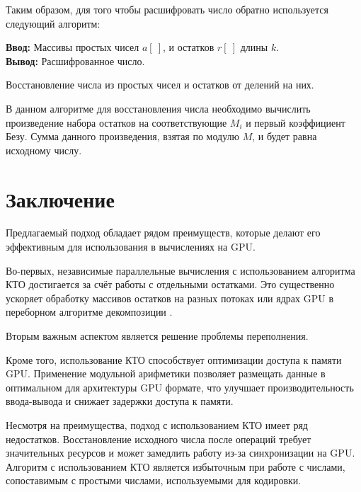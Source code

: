 \documentclass[10pt]{article}
\begin{document}
Таким образом, для того чтобы расшифровать число обратно используется следующий алгоритм:

\begin{algorithm}[H]
	\textbf{Ввод:} Массивы простых чисел $a[~]$, и остатков $r[~]$ длины $k$.\\
	\textbf{Вывод:} Расшифрованное число.
	\begin{algorithmic}
	\end{algorithmic}
	\caption{Восстановление числа из простых чисел и остатков от делений на них.}
	\label{algo:crt_decription}
\end{algorithm}

В данном алгоритме для восстановления числа необходимо вычислить произведение набора остатков на соответствующие $M_i$ и первый коэффициент Безу. Сумма данного произведения, взятая по модулю $M$, и будет равна исходному числу.

\section{Заключение}

Предлагаемый подход обладает рядом преимуществ, которые делают его эффективным для использования в вычислениях на GPU. 

Во-первых, независимые параллельные вычисления с использованием алгоритма КТО достигается за счёт работы с отдельными остатками. Это существенно ускоряет обработку массивов остатков на разных потоках или ядрах GPU в переборном алгоритме декомпозиции \cite{trukhin2025alg}.

Вторым важным аспектом является решение проблемы переполнения.

Кроме того, использование КТО способствует оптимизации доступа к памяти GPU. Применение модульной арифметики позволяет размещать данные в оптимальном для архитектуры GPU формате, что улучшает производительность ввода-вывода и снижает задержки доступа к памяти.

Несмотря на преимущества, подход с использованием КТО имеет ряд недостатков. Восстановление исходного числа после операций требует значительных ресурсов и может замедлить работу из-за синхронизации на GPU. Алгоритм с использованием КТО является избыточным при работе с числами, сопоставимым с простыми числами, используемыми для кодировки.
\end{document}

